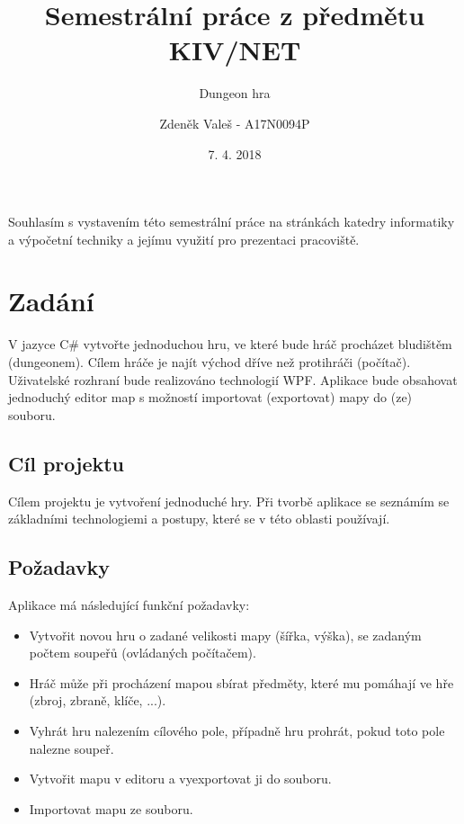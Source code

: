 \documentclass[11pt,a4paper]{scrartcl}
\begin{document}
	\title{Semestrální práce z předmětu KIV/NET}
	\subtitle{Dungeon hra}
	\author{Zdeněk Valeš - A17N0094P}
	\date{7. 4. 2018}
	\maketitle
	\newpage
	
	Souhlasím s vystavením této semestrální práce na stránkách katedry informatiky a výpočetní techniky a jejímu využití pro prezentaci pracoviště.
	
	\newpage
	
	\section{Zadání}
	V jazyce C\# vytvořte jednoduchou hru, ve které bude hráč procházet bludištěm (dungeonem). Cílem hráče je najít východ dříve než protihráči (počítač). Uživatelské rozhraní bude realizováno technologií WPF. Aplikace bude obsahovat jednoduchý editor map s možností importovat (exportovat) mapy do (ze) souboru.
	
	\subsection{Cíl projektu}
	Cílem projektu je vytvoření jednoduché hry. Při tvorbě aplikace se seznámím se základními technologiemi a postupy, které se v této oblasti používají.
	
	\subsection{Požadavky}
	Aplikace má následující funkční požadavky:
	\begin{itemize}
		\item Vytvořit novou hru o zadané velikosti mapy (šířka, výška), se zadaným počtem soupeřů (ovládaných počítačem).
		
		\item Hráč může při procházení mapou sbírat předměty, které mu pomáhají ve hře (zbroj, zbraně, klíče, ...).
		
		\item Vyhrát hru nalezením cílového pole, případně hru prohrát, pokud toto pole nalezne soupeř.
		
		\item Vytvořit mapu v editoru a vyexportovat ji do souboru.
		
		\item Importovat mapu ze souboru.
	\end{itemize}
	
\end{document}
